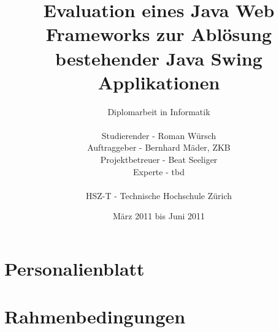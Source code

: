 \documentclass[
11pt, %
a4paper, %
BCOR25mm, %
DIV14, %
footsepline = false, %
headsepline, %
twoside, %
openright,
abstracton, %
listof=totocnumbered, %
bibliography=totocnumbered %
]{scrreprt}
\title{Evaluation eines Java Web Frameworks zur Ablösung bestehender Java Swing
Applikationen}
\author{Diplomarbeit in Informatik\\
    \\
    Studierender - Roman Würsch\\
	Auftraggeber - Bernhard Mäder, ZKB\\
    Projektbetreuer - Beat Seeliger\\
    Experte - tbd\\
	\\
	HSZ-T - Technische Hochschule Zürich}
\date{März 2011 bis Juni 2011}
\begin{document}
  \ifpdf
  \else
  \fi
  
  
  \maketitle
  
  \cleardoublepage
  
  
  
  
  
  \cleardoublepage
  

  
  \tableofcontents
  
  \cleardoublepage
  
  
  
  \chapter{Personalienblatt}\label{chapter:Personalienblatt}

  
  
      
  
  \chapter{Rahmenbedingungen}\label{chapter:Rahmenbedingungen}
  
\end{document}
